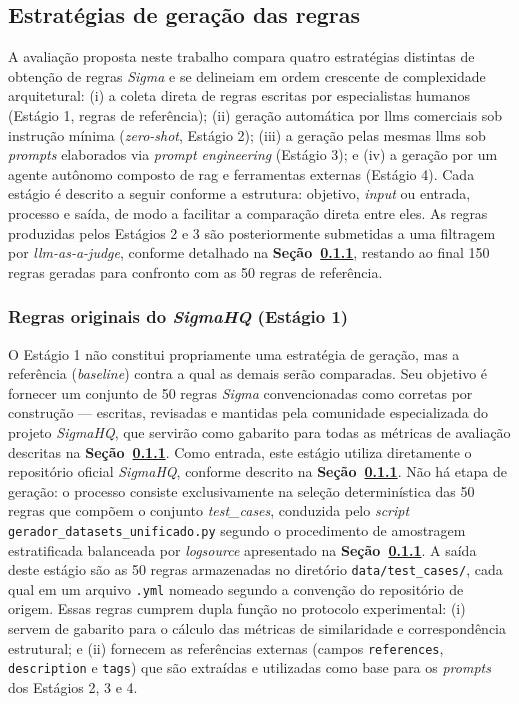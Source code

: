 \subsection{Estratégias de geração das regras}

A avaliação proposta neste trabalho compara quatro estratégias distintas de obtenção de regras \textit{Sigma} e se delineiam em ordem crescente de complexidade arquitetural: 
(i) a coleta direta de regras escritas por especialistas humanos (Estágio 1, regras de referência);
(ii) geração automática por \gls{llm}s comerciais sob instrução mínima (\textit{zero-shot}, Estágio 2);
(iii) a geração pelas mesmas \gls{llm}s sob \textit{prompts} elaborados via \textit{prompt engineering} (Estágio 3);
e (iv) a geração por um agente autônomo composto de \gls{rag} e ferramentas externas (Estágio 4). 
Cada estágio é descrito a seguir conforme a estrutura: objetivo, \textit{input} ou entrada, processo e saída, de modo a facilitar a comparação direta entre eles. 
As regras produzidas pelos Estágios 2 e 3 são posteriormente submetidas a uma filtragem por \textit{\gls{llm}-as-a-judge}, conforme detalhado na \textbf{Seção~\ref{}}, restando ao final 150 regras geradas para confronto com as 50 regras de referência.

\subsubsection{Regras originais do \textit{SigmaHQ} (Estágio 1)}

O Estágio 1 não constitui propriamente uma estratégia de geração, mas a referência (\textit{baseline}) contra a qual as demais serão comparadas. 
Seu objetivo é fornecer um conjunto de 50 regras \textit{Sigma} convencionadas como corretas por construção --- escritas, revisadas e mantidas pela comunidade especializada do projeto \textit{SigmaHQ}, que servirão como gabarito para todas as métricas de avaliação descritas na \textbf{Seção~\ref{}}.
Como entrada, este estágio utiliza diretamente o repositório oficial \textit{SigmaHQ}, conforme descrito na \textbf{Seção~\ref{}}. 
Não há etapa de geração: o processo consiste exclusivamente na seleção determinística das 50 regras que compõem o conjunto \textit{test\_cases}, conduzida pelo \textit{script} \texttt{gerador\_datasets\_unificado.py} segundo o procedimento de amostragem estratificada balanceada por \textit{logsource} apresentado na \textbf{Seção~\ref{}}.
A saída deste estágio são as 50 regras armazenadas no diretório \texttt{data/test\_cases/}, cada qual em um arquivo \texttt{.yml} nomeado segundo a convenção do repositório de origem. Essas regras cumprem dupla função no protocolo experimental: (i) servem de gabarito para o cálculo das métricas de similaridade e correspondência estrutural; e (ii) fornecem as referências externas (campos \texttt{references}, \texttt{description} e \texttt{tags}) que são extraídas e utilizadas como base para os \textit{prompts} dos Estágios 2, 3 e 4.

